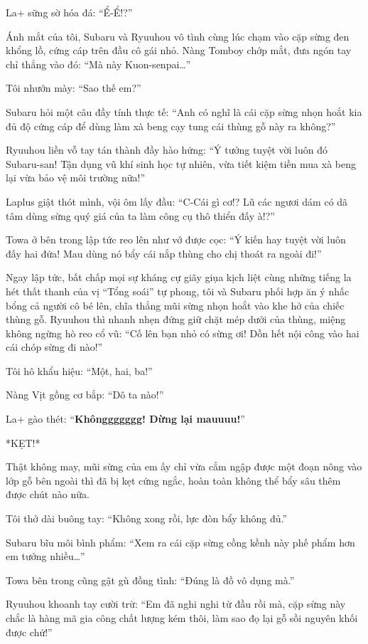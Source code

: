 \documentclass[../main.tex]{subfiles}
\begin{document}
La+ sững sờ hóa đá: ``Ể-Ể!?''

Ánh mắt của tôi, Subaru và Ryuuhou vô tình cùng lúc chạm vào cặp sừng đen khổng lồ, cứng cáp trên đầu cô gái nhỏ. Nàng Tomboy chớp mắt, đưa ngón tay chỉ thẳng vào đó: ``Mà này Kuon-senpai\dots''

Tôi nhướn mày: ``Sao thế em?''

Subaru hỏi một câu đầy tính thực tế: ``Anh có nghĩ là cái cặp sừng nhọn hoắt kia đủ độ cứng cáp để dùng làm xà beng cạy tung cái thùng gỗ này ra không?''

Ryuuhou liền vỗ tay tán thành đầy hào hứng: ``Ý tưởng tuyệt vời luôn đó Subaru-san! Tận dụng vũ khí sinh học tự nhiên, vừa tiết kiệm tiền mua xà beng lại vừa bảo vệ môi trường nữa!''

Laplus giật thót mình, vội ôm lấy đầu: ``C-Cái gì cơ!? Lũ các ngươi dám có dã tâm dùng sừng quý giá của ta làm công cụ thô thiển đấy à!?''

Towa ở bên trong lập tức reo lên như vớ được cọc: ``Ý kiến hay tuyệt vời luôn đấy hai đứa! Mau dùng nó bẩy cái nắp thùng cho chị thoát ra ngoài đi!''

Ngay lập tức, bất chấp mọi sự kháng cự giãy giụa kịch liệt cùng những tiếng la hét thất thanh của vị ``Tổng soái'' tự phong, tôi và Subaru phối hợp ăn ý nhấc bổng cả người cô bé lên, chĩa thẳng mũi sừng nhọn hoắt vào khe hở của chiếc thùng gỗ. Ryuuhou thì nhanh nhẹn đứng giữ chặt mép dưới của thùng, miệng không ngừng hò reo cổ vũ: ``Cố lên bạn nhỏ có sừng ơi! Dồn hết nội công vào hai cái chóp sừng đi nào!''

Tôi hô khẩu hiệu: ``Một, hai, ba!''

Nàng Vịt gồng cơ bắp: ``Dô ta nào!''

La+ gào thét: ``\textbf{Khônggggggg! Dừng lại mauuuu!}''

*KẸT!*

Thật không may, mũi sừng của em ấy chỉ vừa cắm ngập được một đoạn nông vào lớp gỗ bên ngoài thì đã bị kẹt cứng ngắc, hoàn toàn không thể bẩy sâu thêm được chút nào nữa.

Tôi thở dài buông tay: ``Không xong rồi, lực đòn bẩy không đủ.''

Subaru bĩu môi bình phẩm: ``Xem ra cái cặp sừng cồng kềnh này phế phẩm hơn em tưởng nhiều\dots''

Towa bên trong cũng gật gù đồng tình: ``Đúng là đồ vô dụng mà.''

Ryuuhou khoanh tay cười trừ: ``Em đã nghi nghi từ đầu rồi mà, cặp sừng này chắc là hàng mã gia công chất lượng kém thôi, làm sao đọ lại gỗ sồi nguyên khối được chứ!''
\end{document}
